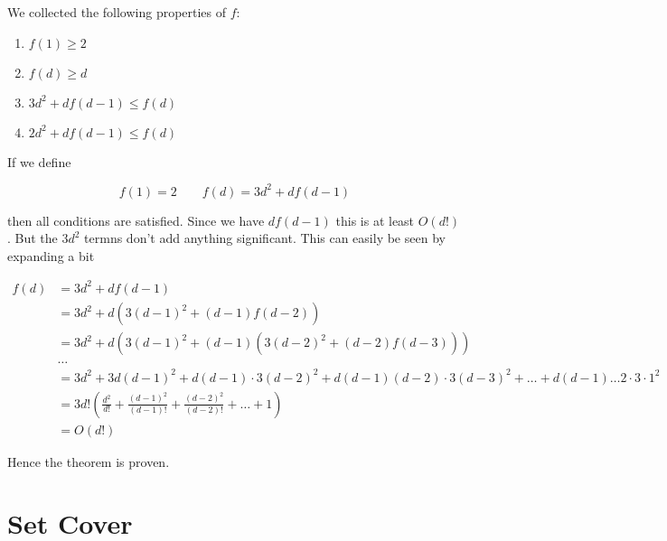 \begin{pr}
We collected the following properties of $f$:
\begin{enumerate}
\item \label{seidelFone} $f(1)\geq 2$
\item \label{seidelFtwo} $f(d)\geq d$
\item \label{seidelFthree} $3d^2+df(d-1) \leq f(d)$
\item \label{seidelFfour} $2d^2+df(d-1) \leq f(d)$
\end{enumerate}

If we define 

\[f(1) = 2 \qquad f(d) = 3d^2 + df(d-1)\]

then all conditions are satisfied. Since we have $df(d-1)$ this is at least $O(d!)$. But the $3d^2$ termns don't add anything significant. This can easily be seen by expanding a bit

\begin{align*}
f(d) &= 3d^2 + df(d-1)\\
	&= 3d^2+d(3(d-1)^2 + (d-1)f(d-2))\\
	&= 3d^2+d(3(d-1)^2 + (d-1)(3(d-2)^2 + (d-2)f(d-3)))\\
	&\hdots\\
	&=3d^2 +3d(d-1)^2 + d(d-1)\cdot 3(d-2)^2 + d(d-1)(d-2) \cdot 3(d-3)^2 + \ldots + d(d-1)\ldots 2\cdot 3 \cdot 1^2\\
	&=3d! (\frac{d^2}{d!} + \frac{(d-1)^2}{(d-1)!} + \frac{(d-2)^2}{(d-2)!} + \ldots + 1)\\
	&= O(d!)
\end{align*}

Hence the theorem is proven.
\end{pr}

\section{Set Cover}


